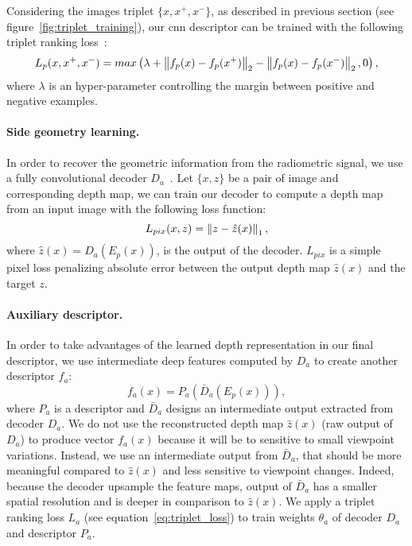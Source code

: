Considering the images triplet $\{x, x^+, x^-\}$, as described in previous section (see figure~\ref{fig:triplet_training}), our \ac{cnn} descriptor can be trained with the following triplet ranking loss~\citep{Arandjelovic2017}:
\begin{equation}
	\label{eq:triplet_loss}
	L_p(x, x^+, x^-) = max\left(\lambda + \left\lVert f_p(x) - f_p(x^+)\right\rVert_2 - \left\lVert f_p(x) - f_p(x^-)\right\rVert_2, 0 \right),
\end{equation}
where $\lambda$ is an hyper-parameter controlling the margin between positive and negative examples.

\paragraph{Side geometry learning.}
In order to recover the geometric information from the radiometric signal, we use a fully convolutional decoder $D_a$~\citep{Eigen2014}. Let $\{x, z\}$ be a pair of image and corresponding depth map, we can train our decoder to compute a depth map from an input image with the following loss function:
\begin{equation}
	\label{eq:l1_loss}
    L_{pix}(x,z) = \left\lVert z - \hat{z}(x)\right\rVert_{1},
\end{equation}
where $\hat{z}(x) = D_a(E_p(x))$, is the output of the decoder. $L_{pix}$ is a simple pixel loss penalizing absolute error between the output depth map $\hat{z}(x)$ and the target $z$.

\paragraph{Auxiliary descriptor.}
In order to take advantages of the learned depth representation in our final descriptor, we use intermediate deep features computed by $D_a$ to create another descriptor $f_a$:
\begin{equation}
	\label{eq:desc_aux}
	f_a(x) = P_a(\bar{D}_a(E_p(x))),
\end{equation}
where $P_a$ is a descriptor and $\bar{D}_a$ designs an intermediate output extracted from decoder $D_a$. We do not use the reconstructed depth map $\hat{z}(x)$ (\ie raw output of $D_a$) to produce vector $f_a(x)$ because it will be to sensitive to small viewpoint variations. Instead, we use an intermediate output from $\bar{D}_a$, that should be more meaningful compared to  $\hat{z}(x)$ and less sensitive to viewpoint changes. Indeed, because the decoder upsample the feature maps, output of $\bar{D}_a$ has a smaller spatial resolution and is deeper in comparison to $\hat{z}(x)$. We apply a triplet ranking loss $L_a$ (see equation~\ref{eq:triplet_loss}) to train weights $\theta_{a}$ of decoder $D_a$ and descriptor $P_a$. 

